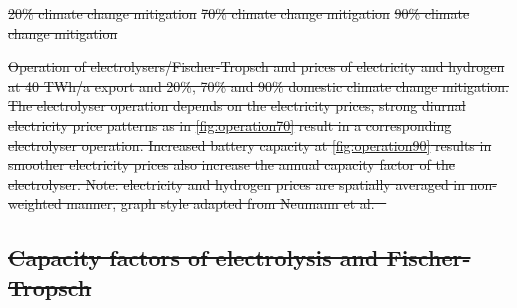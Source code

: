 \documentclass[5p,numafflabel]{elsarticle}
\def\heatmaplowred{elec_s_4_ec_lc3.0_Co2L0.80_3H_2030_0.13_DF_40export}
\def\heatmapmedred{elec_s_4_ec_lc3.0_Co2L0.30_3H_2030_0.13_DF_40export}
\def\heatmaphighred{elec_s_4_ec_lc3.0_Co2L0.10_3H_2030_0.13_DF_40export}
\providecommand{\DIFdeltex}[1]{{\protect\color{red}\sout{#1}}}                      %
\providecommand{\DIFdelFL}[1]{\DIFdel{#1}} %
\providecommand{\DIFdel}[1]{\texorpdfstring{\DIFdeltex{#1}}{}} %
\begin{document}

{%
\DIFdelFL{20\% climate change mitigation}}
{%
\DIFdelFL{70\% climate change mitigation}}
{%
\DIFdelFL{90\% climate change mitigation}}

{%
\DIFdelFL{Operation of electrolysers/Fischer-Tropsch and prices of electricity and hydrogen at 40 TWh/a export and 20\%, 70\% and 90\% domestic climate change mitigation. The electrolyser operation depends on the electricity prices, strong diurnal electricity price patterns as in \ref{fig:operation70} result in a corresponding electrolyser operation. Increased battery capacity at \ref{fig:operation90} results in smoother electricity prices also increase the annual capacity factor of the electrolyser. Note: electricity and hydrogen prices are spatially averaged in non-weighted manner, graph style adapted from Neumann et al. \mbox{%
\cite{Neumann2022}}\hspace{0pt}%
}}

\subsection{\DIFdel{Capacity factors of electrolysis and Fischer-Tropsch}}
\addtocounter{subsection}{-1}%
\end{document}
